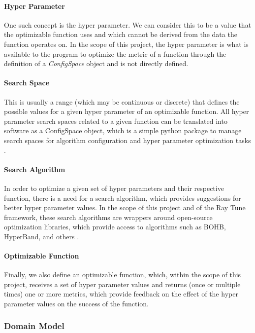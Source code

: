 \paragraph{Hyper Parameter}

One such concept is the hyper parameter. We can consider this to be a value that the optimizable function uses and which cannot be derived from the data the function operates on. In the scope of this project, the hyper parameter is what is available to the program to optimize the metric of a function through the definition of a \textit{ConfigSpace} object and is not directly defined. 

\paragraph{Search Space}

This is usually a range (which may be continuous or discrete) that defines the possible values for a given hyper parameter of an optimizable function. All hyper parameter search spaces related to a given function can be translated into software as a ConfigSpace object, which is a simple python package to manage search spaces for algorithm configuration and hyper parameter optimization tasks \parencite{BOAH}.

\paragraph{Search Algorithm}

In order to optimize a given set of hyper parameters and their respective function, there is a need for a search algorithm, which provides suggestions for better hyper parameter values. In the scope of this project and of the Ray Tune framework, these search algorithms are wrappers around open-source optimization libraries, which provide access to algorithms such as BOHB, HyperBand, and others \parencite{ray}.

\paragraph{Optimizable Function}

Finally, we also define an optimizable function, which, within the scope of this project, receives a set of hyper parameter values and returns (once or multiple times) one or more metrics, which provide feedback on the effect of the hyper parameter values on the success of the function.

\subsubsection{Domain Model}

